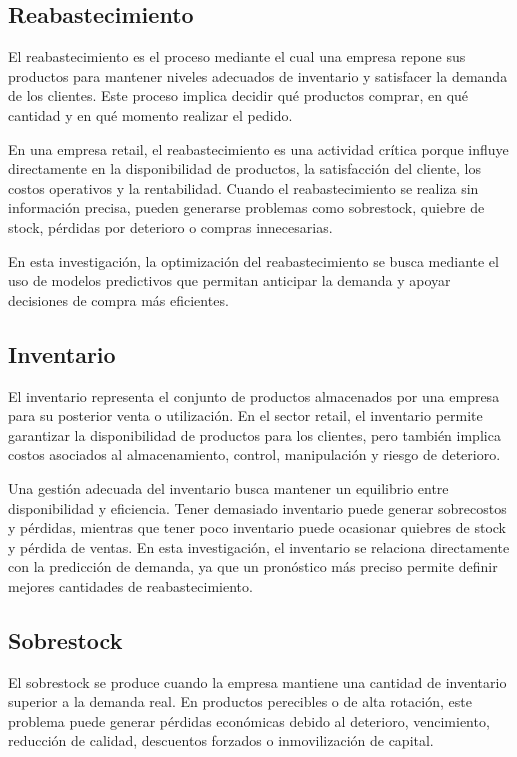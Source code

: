 \subsection{Reabastecimiento}

El reabastecimiento es el proceso mediante el cual una empresa repone sus productos para mantener niveles adecuados de inventario y satisfacer la demanda de los clientes. Este proceso implica decidir qué productos comprar, en qué cantidad y en qué momento realizar el pedido.

En una empresa retail, el reabastecimiento es una actividad crítica porque influye directamente en la disponibilidad de productos, la satisfacción del cliente, los costos operativos y la rentabilidad. Cuando el reabastecimiento se realiza sin información precisa, pueden generarse problemas como sobrestock, quiebre de stock, pérdidas por deterioro o compras innecesarias.

En esta investigación, la optimización del reabastecimiento se busca mediante el uso de modelos predictivos que permitan anticipar la demanda y apoyar decisiones de compra más eficientes.

\subsection{Inventario}

El inventario representa el conjunto de productos almacenados por una empresa para su posterior venta o utilización. En el sector retail, el inventario permite garantizar la disponibilidad de productos para los clientes, pero también implica costos asociados al almacenamiento, control, manipulación y riesgo de deterioro.

Una gestión adecuada del inventario busca mantener un equilibrio entre disponibilidad y eficiencia. Tener demasiado inventario puede generar sobrecostos y pérdidas, mientras que tener poco inventario puede ocasionar quiebres de stock y pérdida de ventas. En esta investigación, el inventario se relaciona directamente con la predicción de demanda, ya que un pronóstico más preciso permite definir mejores cantidades de reabastecimiento.

\subsection{Sobrestock}

El sobrestock se produce cuando la empresa mantiene una cantidad de inventario superior a la demanda real. En productos perecibles o de alta rotación, este problema puede generar pérdidas económicas debido al deterioro, vencimiento, reducción de calidad, descuentos forzados o inmovilización de capital.

